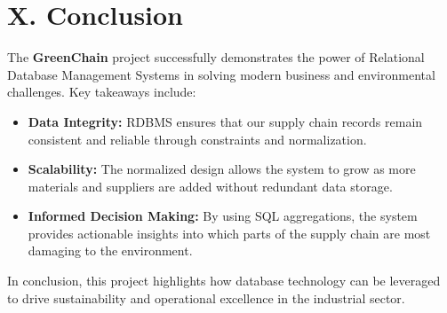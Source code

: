 \documentclass[12pt,a4paper]{article}
\begin{document}
\vspace{1cm}
\section*{X. Conclusion}

The \textbf{GreenChain} project successfully demonstrates the power of Relational Database Management Systems in solving modern business and environmental challenges. Key takeaways include:

\begin{itemize}
    \item \textbf{Data Integrity:} RDBMS ensures that our supply chain records remain consistent and reliable through constraints and normalization.
    \item \textbf{Scalability:} The normalized design allows the system to grow as more materials and suppliers are added without redundant data storage.
    \item \textbf{Informed Decision Making:} By using SQL aggregations, the system provides actionable insights into which parts of the supply chain are most damaging to the environment.
\end{itemize}

In conclusion, this project highlights how database technology can be leveraged to drive sustainability and operational excellence in the industrial sector.
\end{document}
